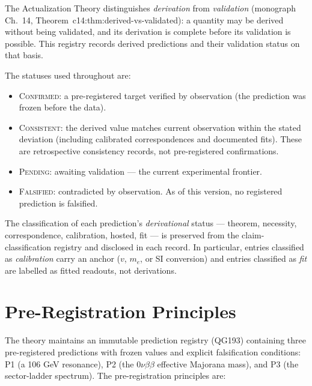 \documentclass[11pt,a4paper]{article}
\begin{document}
The Actualization Theory distinguishes \emph{derivation} from \emph{validation}
(monograph Ch.~14, Theorem~c14:thm:derived-vs-validated): a quantity may be derived without
being validated, and its derivation is complete before its validation is possible. This
registry records derived predictions and their validation status on that basis.

The statuses used throughout are:

\begin{itemize}
  \item \textsc{Confirmed}: a pre-registered target verified by observation (the prediction
        was frozen before the data).
  \item \textsc{Consistent}: the derived value matches current observation within the
        stated deviation (including calibrated correspondences and documented fits). These
        are retrospective consistency records, not pre-registered confirmations.
  \item \textsc{Pending}: awaiting validation --- the current experimental frontier.
  \item \textsc{Falsified}: contradicted by observation. As of this version, no registered
        prediction is falsified.
\end{itemize}

The classification of each prediction's \emph{derivational} status --- theorem, necessity,
correspondence, calibration, hosted, fit --- is preserved from the claim-classification
registry and disclosed in each record. In particular, entries classified as
\emph{calibration} carry an anchor ($v$, $m_e$, or SI conversion) and entries classified as
\emph{fit} are labelled as fitted readouts, not derivations.

\section{Pre-Registration Principles}
\label{sec:pre-registration}

The theory maintains an immutable prediction registry (QG193) containing three
pre-registered predictions with frozen values and explicit falsification conditions:
P1 (a 106 GeV resonance), P2 (the $0\nu\beta\beta$ effective Majorana mass), and P3 (the
sector-ladder spectrum). The pre-registration principles are:
\end{document}
